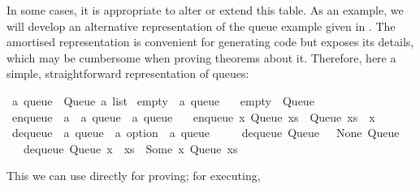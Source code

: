 \begin{isabellebody}
\begin{isamarkuptext}
  In some cases, it is appropriate to alter or extend this table.  As
  an example, we will develop an alternative representation of the
  queue example given in .  The amortised
  representation is convenient for generating code but exposes its
   details, which may be cumbersome when proving
  theorems about it.  Therefore, here a simple, straightforward
  representation of queues:%
\end{isamarkuptext}%
\isamarkuptrue%
%
\isadelimquote
%
\endisadelimquote
%
\isatagquote
{}\isamarkupfalse%
\ {\isacharprime}a\ queue\ {\isacharequal}\ Queue\ {\isachardoublequoteopen}{\isacharprime}a\ list{\isachardoublequoteclose}\isanewline
\isanewline
{}\isamarkupfalse%
\ empty\ {\isacharcolon}{\isacharcolon}\ {\isachardoublequoteopen}{\isacharprime}a\ queue{\isachardoublequoteclose}\ \isanewline
\ \ {\isachardoublequoteopen}empty\ {\isacharequal}\ Queue\ {\isacharbrackleft}{\isacharbrackright}{\isachardoublequoteclose}\isanewline
\isanewline
{}\isamarkupfalse%
\ enqueue\ {\isacharcolon}{\isacharcolon}\ {\isachardoublequoteopen}{\isacharprime}a\ {\isasymRightarrow}\ {\isacharprime}a\ queue\ {\isasymRightarrow}\ {\isacharprime}a\ queue{\isachardoublequoteclose}\ \isanewline
\ \ {\isachardoublequoteopen}enqueue\ x\ {\isacharparenleft}Queue\ xs{\isacharparenright}\ {\isacharequal}\ Queue\ {\isacharparenleft}xs\ {\isacharat}\ {\isacharbrackleft}x{\isacharbrackright}{\isacharparenright}{\isachardoublequoteclose}\isanewline
\isanewline
{}\isamarkupfalse%
\ dequeue\ {\isacharcolon}{\isacharcolon}\ {\isachardoublequoteopen}{\isacharprime}a\ queue\ {\isasymRightarrow}\ {\isacharprime}a\ option\ {\isasymtimes}\ {\isacharprime}a\ queue{\isachardoublequoteclose}\ \isanewline
\ \ \ \ {\isachardoublequoteopen}dequeue\ {\isacharparenleft}Queue\ {\isacharbrackleft}{\isacharbrackright}{\isacharparenright}\ {\isacharequal}\ {\isacharparenleft}None{\isacharcomma}\ Queue\ {\isacharbrackleft}{\isacharbrackright}{\isacharparenright}{\isachardoublequoteclose}\isanewline
\ \ {\isacharbar}\ {\isachardoublequoteopen}dequeue\ {\isacharparenleft}Queue\ {\isacharparenleft}x\ {\isacharhash}\ xs{\isacharparenright}{\isacharparenright}\ {\isacharequal}\ {\isacharparenleft}Some\ x{\isacharcomma}\ Queue\ xs{\isacharparenright}{\isachardoublequoteclose}%
\endisatagquote
{\isafoldquote}%
%
\isadelimquote
%
\endisadelimquote
%
\begin{isamarkuptext}%
\noindent This we can use directly for proving;  for executing,

\end{isamarkuptext}
\end{isabellebody}
